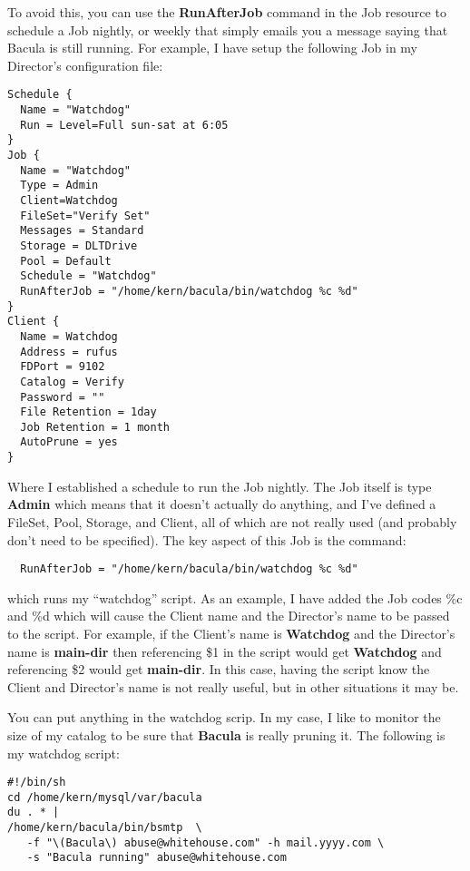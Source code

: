 To avoid this, you can use the {\bf RunAfterJob} command in the Job resource
to schedule a Job nightly, or weekly that simply emails you a message saying
that Bacula is still running. For example, I have setup the following Job in
my Director's configuration file: 

\footnotesize
\begin{verbatim}
Schedule {
  Name = "Watchdog"
  Run = Level=Full sun-sat at 6:05
}
Job {
  Name = "Watchdog"
  Type = Admin
  Client=Watchdog
  FileSet="Verify Set"
  Messages = Standard
  Storage = DLTDrive
  Pool = Default
  Schedule = "Watchdog"
  RunAfterJob = "/home/kern/bacula/bin/watchdog %c %d"
}
Client {
  Name = Watchdog
  Address = rufus
  FDPort = 9102
  Catalog = Verify
  Password = ""
  File Retention = 1day
  Job Retention = 1 month
  AutoPrune = yes
}
\end{verbatim}
\normalsize

Where I established a schedule to run the Job nightly. The Job itself is type
{\bf Admin} which means that it doesn't actually do anything, and I've defined
a FileSet, Pool, Storage, and Client, all of which are not really used (and
probably don't need to be specified). The key aspect of this Job is the
command: 

\footnotesize
\begin{verbatim}
  RunAfterJob = "/home/kern/bacula/bin/watchdog %c %d"
\end{verbatim}
\normalsize

which runs my ``watchdog'' script. As an example, I have added the Job codes
\%c and \%d which will cause the Client name and the Director's name to be
passed to the script. For example, if the Client's name is {\bf Watchdog} and
the Director's name is {\bf main-dir} then referencing \$1 in the script would
get {\bf Watchdog} and referencing \$2 would get {\bf main-dir}. In this case,
having the script know the Client and Director's name is not really useful,
but in other situations it may be. 

You can put anything in the watchdog scrip. In my case, I like to monitor the
size of my catalog to be sure that {\bf Bacula} is really pruning it. The
following is my watchdog script: 

\footnotesize
\begin{verbatim}
#!/bin/sh
cd /home/kern/mysql/var/bacula
du . * |
/home/kern/bacula/bin/bsmtp  \
   -f "\(Bacula\) abuse@whitehouse.com" -h mail.yyyy.com \
   -s "Bacula running" abuse@whitehouse.com
\end{verbatim}
\normalsize

